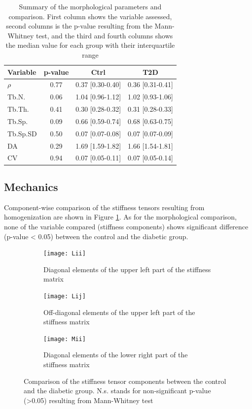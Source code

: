 \documentclass[a4paper,fleqn]{DC_ArtStyle}
\begin{document}
	\begin{table}[h!]
		\centering
		\caption{Summary of the morphological parameters and comparison. First column shows the variable assessed, second columns is the p-value resulting from the Mann-Whitney test, and the third and fourth columns shows the median value for each group with their interquartile range}
		\begin{tabular}{l|ccc}
			Variable & p-value & Ctrl & T2D \\\hline
			$\rho$ & 0.77 & 0.37 [0.30-0.40] & 0.36 [0.31-0.41] \\
			Tb.N. & 0.06 & 1.04 [0.96-1.12] & 1.02 [0.93-1.06] \\
			Tb.Th. &  0.41 & 0.30 [0.28-0.32] & 0.31 [0.28-0.33] \\
			Tb.Sp. & 0.09 & 0.66 [0.59-0.74] & 0.68 [0.63-0.75] \\
			Tb.Sp.SD & 0.50 & 0.07 [0.07-0.08] & 0.07 [0.07-0.09] \\
			DA & 0.29 & 1.69 [1.59-1.82] & 1.66 [1.54-1.81] \\
			CV & 0.94 & 0.07 [0.05-0.11] & 0.07 [0.05-0.14] \\
		\end{tabular}
		\label{TabMorph}
	\end{table}

	\subsection{Mechanics}
	Component-wise comparison of the stiffness tensors resulting from homogenization are shown in Figure \ref{FigTensorComp}.
	As for the morphological comparison, none of the variable compared (stiffness components) shows significant difference (p-value < 0.05) between the control and the diabetic group.

	\begin{figure}
		\centering
		\begin{subfigure}[b]{0.3\linewidth}
			\texttt{[image: Lii]}
			\caption{Diagonal elements of the upper left part of the stiffness matrix}
		\end{subfigure}\hfill
		\begin{subfigure}[b]{0.3\linewidth}
			\texttt{[image: Lij]}
			\caption{Off-diagonal elements of the upper left part of the stiffness matrix}
		\end{subfigure}\hfill
		\begin{subfigure}[b]{0.3\linewidth}
			\texttt{[image: Mii]}
			\caption{Diagonal elements of the lower right part of the stiffness matrix}
		\end{subfigure}
		\caption{Comparison of the stiffness tensor components between the control and the diabetic group.
				 N.s. stands for non-significant p-value (>0.05) resulting from Mann-Whitney test}
		\label{FigTensorComp}
	\end{figure}
\end{document}

